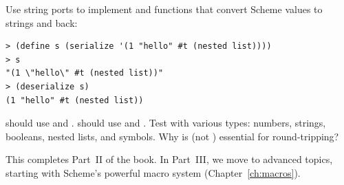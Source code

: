 \begin{exercise}
Use string ports to implement  and  functions that convert Scheme values to strings and back:

\begin{lstlisting}[style=repl]
> (define s (serialize '(1 "hello" #t (nested list))))
> s
"(1 \"hello\" #t (nested list))"
> (deserialize s)
(1 "hello" #t (nested list))
\end{lstlisting}

 should use  and .  should use  and . Test with various types: numbers, strings, booleans, nested lists, and symbols. Why is  (not ) essential for round-tripping?
\end{exercise}

This completes Part~II of the book. In Part~III, we move to advanced topics, starting with Scheme's powerful macro system (Chapter~\ref{ch:macros}).

\chapterend
